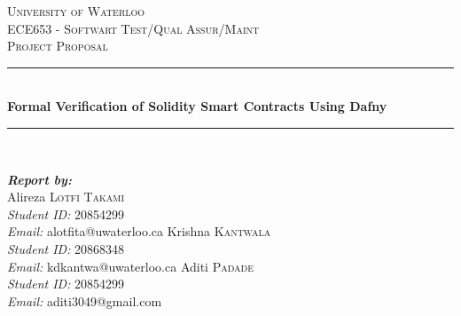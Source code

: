 \documentclass[11pt]{article}
\begin{document}
\onehalfspacing

\setlength{\droptitle}{-5em} %

\begin{titlepage}
\newcommand{\HRule}{\rule{\linewidth}{0.1mm}} 
\center %
 

\textsc{\Large University of Waterloo}\\ %
\textsc{\Large ECE653 - Softwart Test/Qual Assur/Maint}\\ %
\textsc{\large Project Proposal}\\ %

\HRule \\[0.4cm]
{ \huge \bfseries Formal Verification of Solidity Smart Contracts Using Dafny }\\[0.1cm] %
\HRule \\[1.5cm]
 

\begin{minipage}{0.4\textwidth}
\begin{flushleft} \large

\emph{\bfseries Report by:}\\
Alireza \textsc{Lotfi Takami}\\
\emph{Student ID:} 20854299\\
\emph{Email:} alotfita@uwaterloo.ca
Krishna \textsc{Kantwala}\\
\emph{Student ID:} 20868348\\
\emph{Email:} kdkantwa@uwaterloo.ca
Aditi \textsc{Padade}\\
\emph{Student ID:} 20854299\\
\emph{Email:} aditi3049@gmail.com
\end{flushleft}


\end{minipage}
\end{titlepage}
\end{document}
